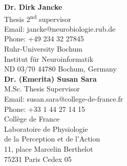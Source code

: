 \textbf{Dr. Dirk Jancke }\\
Thesis 2\textsuperscript{nd} supervisor \\
Email:  jancke@neurobiologie.rub.de \\
Phone:  +49 234 32 27845\\
Ruhr-University Bochum\\ 
Institut f\"ur Neuroinformatik \\
ND 03/70 44780 Bochum, Germany \\

\textbf{Dr. (Emerita) Susan Sara }\\
M.Sc. Thesis Supervisor\\ 
Email:  susan.sara@college-de-france.fr \\
Phone:  +33 1 44 27 14 15\\
Coll\`ege de France \\
Laboratoire de Physiologie \\de la Perception et de l'Action \\
11, place Marcelin Berthelot \\
75231 Paris Cedex 05\\



